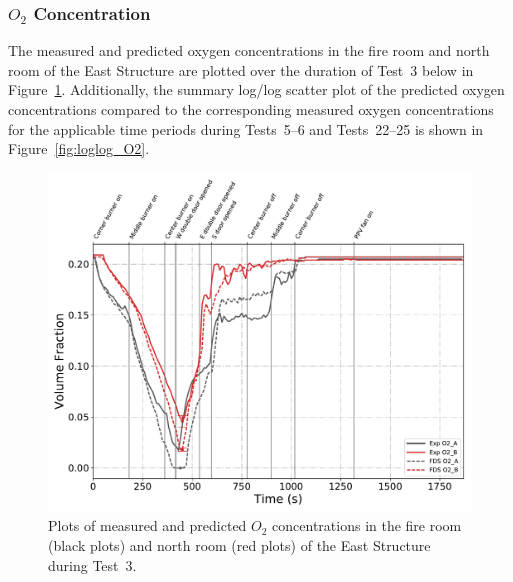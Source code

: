 \subsubsection*{\textit{$O_2$} Concentration}
The measured and predicted oxygen concentrations in the fire room and north room of the East Structure are plotted over the duration of Test~3 below in Figure~\ref{fig:Test3_O2}. Additionally, the summary log/log scatter plot of the predicted oxygen concentrations compared to the corresponding measured oxygen concentrations for the applicable time periods during Tests~5--6 and Tests~22--25 is shown in Figure~\ref{fig:loglog_O2}.
\begin{figure}[!h]
	\centering
	\includegraphics[width=\columnwidth]{Figures/Plots/Validation/Gas_Concentration/Test_3_O2}
	\caption[Plots of measured and predicted $O_2$ concentration during Test~3.]{Plots of measured and predicted $O_2$ concentrations in the fire room (black plots) and north room (red plots) of the East Structure during Test~3.}
	\label{fig:Test3_O2}
\end{figure}

